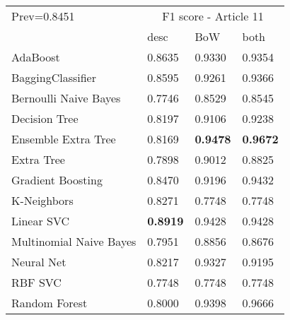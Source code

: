 \begin{tabular}{|l|l|l|l| }
\hline
Prev=0.8451 &  \multicolumn{3}{c|}{F1 score - Article 11} \\
\cline{2-4} & desc & BoW & both \\ \hline
AdaBoost                & 0.8635 & 0.9330 & 0.9354\\
BaggingClassifier       & 0.8595 & 0.9261 & 0.9366\\
Bernoulli Naive Bayes   & 0.7746 & 0.8529 & 0.8545\\
Decision Tree           & 0.8197 & 0.9106 & 0.9238\\
Ensemble Extra Tree     & 0.8169 & {\bf 0.9478} & {\bf 0.9672}\\
Extra Tree              & 0.7898 & 0.9012 & 0.8825\\
Gradient Boosting       & 0.8470 & 0.9196 & 0.9432\\
K-Neighbors             & 0.8271 & 0.7748 & 0.7748\\
Linear SVC              & {\bf 0.8919} & 0.9428 & 0.9428\\
Multinomial Naive Bayes & 0.7951 & 0.8856 & 0.8676\\
Neural Net              & 0.8217 & 0.9327 & 0.9195\\
RBF SVC                 & 0.7748 & 0.7748 & 0.7748\\
Random Forest           & 0.8000 & 0.9398 & 0.9666\\
\hline
\end{tabular}